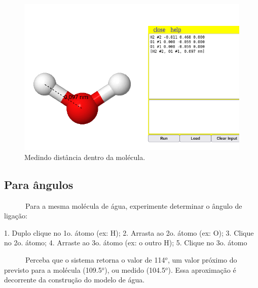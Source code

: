 \documentclass[
  letterpaper,
  DIV=11,
  numbers=noendperiod]{scrreprt}
\newenvironment{Shaded}{\begin{snugshade}}{\end{snugshade}}
\newcommand{\DecValTok}[1]{\textcolor[rgb]{0.68,0.00,0.00}{#1}}
\newcommand{\FloatTok}[1]{\textcolor[rgb]{0.68,0.00,0.00}{#1}}
\newcommand{\FunctionTok}[1]{\textcolor[rgb]{0.28,0.35,0.67}{#1}}
\newcommand{\NormalTok}[1]{\textcolor[rgb]{0.00,0.23,0.31}{#1}}
\newcommand{\SpecialCharTok}[1]{\textcolor[rgb]{0.37,0.37,0.37}{#1}}
\begin{document}
\begin{figure}[H]

{\centering \includegraphics{aguaDist.png}

}

\caption{Medindo distância dentro da molécula.}

\end{figure}%

\subsection{Para ângulos}\label{para-uxe2ngulos}

~~~~~~Para a mesma molécula de água, experimente determinar o ângulo de
ligação:

\begin{Shaded}
\begin{Highlighting}[]
\FloatTok{1.}\NormalTok{ Duplo clique no }\DecValTok{1}\NormalTok{o. á}\FunctionTok{tomo}\NormalTok{ (ex}\SpecialCharTok{:}\NormalTok{ H);}
\FloatTok{2.}\NormalTok{ Arrasta ao }\DecValTok{2}\NormalTok{o. á}\FunctionTok{tomo}\NormalTok{ (ex}\SpecialCharTok{:}\NormalTok{ O);}
\FloatTok{3.}\NormalTok{ Clique no }\DecValTok{2}\NormalTok{o. átomo;}
\FloatTok{4.}\NormalTok{ Arraste ao }\DecValTok{3}\NormalTok{o. á}\FunctionTok{tomo}\NormalTok{ (ex}\SpecialCharTok{:}\NormalTok{ o outro H);}
\FloatTok{5.}\NormalTok{ Clique no }\DecValTok{3}\NormalTok{o. átomo}
\end{Highlighting}
\end{Shaded}

~~~~~~Perceba que o sistema retorna o valor de 114\(^{o}\), um valor
próximo do previsto para a molécula (109.5\(^{o}\)), ou medido
(104.5\(^{o}\)). Essa aproximação é decorrente da construção do modelo
de água.
\end{document}
